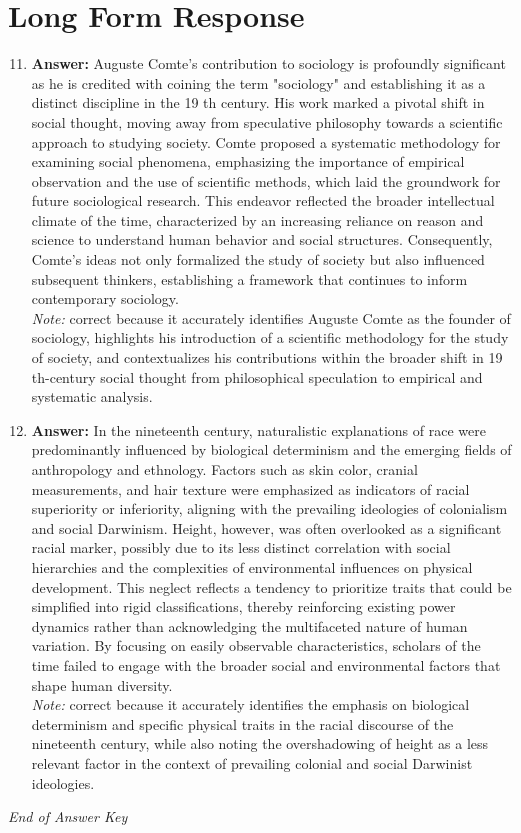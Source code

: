 \documentclass[12pt]{article}
\begin{document}
\section*{Long Form Response}
\begin{enumerate}[label=\arabic*.]
\setcounter{enumi}{10}
\item \textbf{Answer:} Auguste Comte's contribution to sociology is profoundly significant as he is credited with coining the term "sociology" and establishing it as a distinct discipline in the 19 th century. His work marked a pivotal shift in social thought, moving away from speculative philosophy towards a scientific approach to studying society. Comte proposed a systematic methodology for examining social phenomena, emphasizing the importance of empirical observation and the use of scientific methods, which laid the groundwork for future sociological research. This endeavor reflected the broader intellectual climate of the time, characterized by an increasing reliance on reason and science to understand human behavior and social structures. Consequently, Comte's ideas not only formalized the study of society but also influenced subsequent thinkers, establishing a framework that continues to inform contemporary sociology.
\\ \textit{Note:} correct because it accurately identifies Auguste Comte as the founder of sociology, highlights his introduction of a scientific methodology for the study of society, and contextualizes his contributions within the broader shift in 19 th-century social thought from philosophical speculation to empirical and systematic analysis.
\item \textbf{Answer:} In the nineteenth century, naturalistic explanations of race were predominantly influenced by biological determinism and the emerging fields of anthropology and ethnology. Factors such as skin color, cranial measurements, and hair texture were emphasized as indicators of racial superiority or inferiority, aligning with the prevailing ideologies of colonialism and social Darwinism. Height, however, was often overlooked as a significant racial marker, possibly due to its less distinct correlation with social hierarchies and the complexities of environmental influences on physical development. This neglect reflects a tendency to prioritize traits that could be simplified into rigid classifications, thereby reinforcing existing power dynamics rather than acknowledging the multifaceted nature of human variation. By focusing on easily observable characteristics, scholars of the time failed to engage with the broader social and environmental factors that shape human diversity.
\\ \textit{Note:} correct because it accurately identifies the emphasis on biological determinism and specific physical traits in the racial discourse of the nineteenth century, while also noting the overshadowing of height as a less relevant factor in the context of prevailing colonial and social Darwinist ideologies.
\end{enumerate}

\vfill
\noindent\textit{End of Answer Key}
\end{document}
